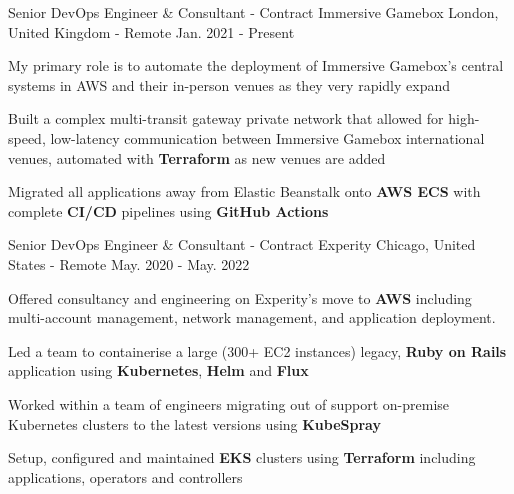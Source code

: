 
\begin{cventries}

  \cventry
    {Senior DevOps Engineer \& Consultant - Contract} %
    {Immersive Gamebox} %
    {London, United Kingdom - Remote} %
    {Jan. 2021 - Present} %
    {
      \begin{cvitems} %
        \item {My primary role is to automate the deployment of Immersive Gamebox’s central systems in AWS and their in-person venues as they very rapidly expand}
        \item {Built a complex multi-transit gateway private network that allowed for high-speed, low-latency communication between Immersive Gamebox international venues, automated with \textbf{Terraform} as new venues are added}
        \item {Migrated all applications away from Elastic Beanstalk onto \textbf{AWS ECS} with complete \textbf{CI/CD} pipelines using \textbf{GitHub Actions}}
      \end{cvitems}
    }

  \cventry
    {Senior DevOps Engineer \& Consultant - Contract} %
    {Experity} %
    {Chicago, United States - Remote} %
    {May. 2020 - May. 2022} %
    {
      \begin{cvitems} %
        \item {Offered consultancy and engineering on Experity's move to \textbf{AWS} including multi-account management, network management, and application deployment.}
        \item {Led a team to containerise a large (300+ EC2 instances) legacy, \textbf{Ruby on Rails} application using \textbf{Kubernetes}, \textbf{Helm} and \textbf{Flux}}
        \item {Worked within a team of engineers migrating out of support on-premise Kubernetes clusters to the latest versions using \textbf{KubeSpray}}
        \item {Setup, configured and maintained \textbf{EKS} clusters using \textbf{Terraform} including applications, operators and controllers}
      \end{cvitems}
    }


\end{cventries}
